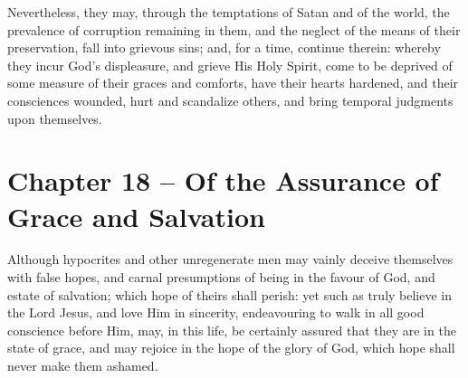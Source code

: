 \begin{outerlst}[left=0pt,labelsep=0pt]
\begin{innerlst}[resume*]
\item Nevertheless, they may, through the temptations of Satan and of the world, the prevalence of corruption remaining in them, and the neglect of the means of their preservation, fall into grievous sins; and, for a time, continue therein: whereby they incur God's displeasure, and grieve His Holy Spirit, come to be deprived of some measure of their graces and comforts, have their hearts hardened, and their consciences wounded, hurt and scandalize others, and bring temporal judgments upon themselves.
\end{innerlst}

\item
{}
\section{Chapter 18 -- Of the Assurance of Grace and Salvation}
\begin{innerlst}[resume*]

\item Although hypocrites and other unregenerate men may vainly deceive themselves with false hopes, and carnal presumptions of being in the favour of God, and estate of salvation; which hope of theirs shall perish: yet such as truly believe in the Lord Jesus, and love Him in sincerity, endeavouring to walk in all good conscience before Him, may, in this life, be certainly assured that they are in the state of grace, and may rejoice in the hope of the glory of God, which hope shall never make them ashamed.   


\end{innerlst}
\end{outerlst}

